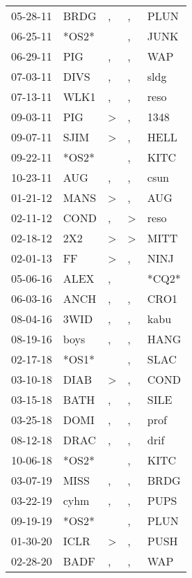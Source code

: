 \begin{supertabular}{lllll}
 05-28-11 &   BRDG &             , &             , &   PLUN \\
 06-25-11 &  *OS2* &               &             , &   JUNK \\
 06-29-11 &    PIG &             , &             , &    WAP \\
 07-03-11 &   DIVS &             , &             , &   sldg \\
 07-13-11 &   WLK1 &             , &             , &   reso \\
 09-03-11 &    PIG &  \textgreater &             , &   1348 \\
 09-07-11 &   SJIM &  \textgreater &             , &   HELL \\
 09-22-11 &  *OS2* &               &             , &   KITC \\
 10-23-11 &    AUG &             , &             , &   csun \\
 01-21-12 &   MANS &  \textgreater &             , &    AUG \\
 02-11-12 &   COND &             , &  \textgreater &   reso \\
 02-18-12 &    2X2 &  \textgreater &  \textgreater &   MITT \\
 02-01-13 &     FF &  \textgreater &             , &   NINJ \\
 05-06-16 &   ALEX &             , &               &  *CQ2* \\
 06-03-16 &   ANCH &             , &             , &   CRO1 \\
 08-04-16 &   3WID &             , &             , &   kabu \\
 08-19-16 &   boys &             , &             , &   HANG \\
 02-17-18 &  *OS1* &               &             , &   SLAC \\
 03-10-18 &   DIAB &  \textgreater &             , &   COND \\
 03-15-18 &   BATH &             , &             , &   SILE \\
 03-25-18 &   DOMI &             , &             , &   prof \\
 08-12-18 &   DRAC &             , &             , &   drif \\
 10-06-18 &  *OS2* &               &             , &   KITC \\
 03-07-19 &   MISS &             , &             , &   BRDG \\
 03-22-19 &   cyhm &             , &             , &   PUPS \\
 09-19-19 &  *OS2* &               &             , &   PLUN \\
 01-30-20 &   ICLR &  \textgreater &             , &   PUSH \\
 02-28-20 &   BADF &             , &             , &    WAP \\
\end{supertabular}
